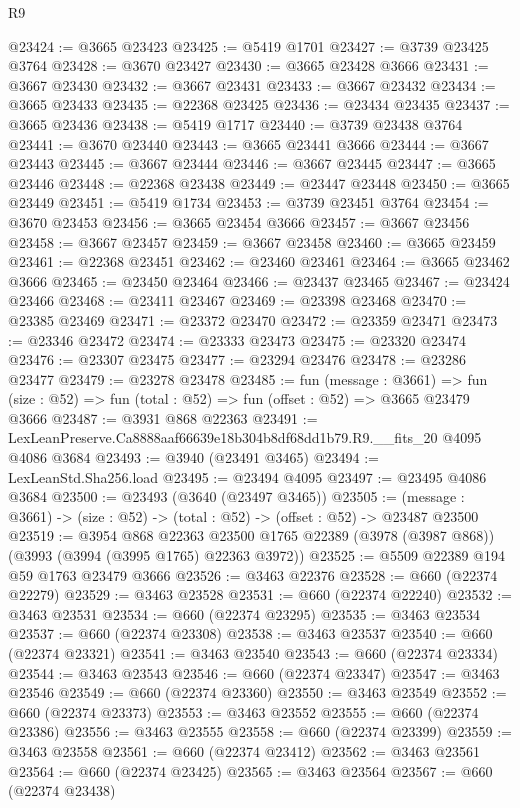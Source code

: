 \begin{lexlean}{R9}
\begin{coremodule}
@23424 := @3665 @23423
@23425 := @5419 @1701
@23427 := @3739 @23425 @3764
@23428 := @3670 @23427
@23430 := @3665 @23428 @3666
@23431 := @3667 @23430
@23432 := @3667 @23431
@23433 := @3667 @23432
@23434 := @3665 @23433
@23435 := @22368 @23425
@23436 := @23434 @23435
@23437 := @3665 @23436
@23438 := @5419 @1717
@23440 := @3739 @23438 @3764
@23441 := @3670 @23440
@23443 := @3665 @23441 @3666
@23444 := @3667 @23443
@23445 := @3667 @23444
@23446 := @3667 @23445
@23447 := @3665 @23446
@23448 := @22368 @23438
@23449 := @23447 @23448
@23450 := @3665 @23449
@23451 := @5419 @1734
@23453 := @3739 @23451 @3764
@23454 := @3670 @23453
@23456 := @3665 @23454 @3666
@23457 := @3667 @23456
@23458 := @3667 @23457
@23459 := @3667 @23458
@23460 := @3665 @23459
@23461 := @22368 @23451
@23462 := @23460 @23461
@23464 := @3665 @23462 @3666
@23465 := @23450 @23464
@23466 := @23437 @23465
@23467 := @23424 @23466
@23468 := @23411 @23467
@23469 := @23398 @23468
@23470 := @23385 @23469
@23471 := @23372 @23470
@23472 := @23359 @23471
@23473 := @23346 @23472
@23474 := @23333 @23473
@23475 := @23320 @23474
@23476 := @23307 @23475
@23477 := @23294 @23476
@23478 := @23286 @23477
@23479 := @23278 @23478
@23485 := fun (message : @3661) =>
  fun (size : @52) => fun (total : @52) => fun (offset : @52) => @3665 @23479 @3666
@23487 := @3931 @868 @22363
@23491 := LexLeanPreserve.Ca8888aaf66639e18b304b8df68dd1b79.R9.__fits_20 @4095 @4086 @3684
@23493 := @3940 (@23491 @3465)
@23494 := LexLeanStd.Sha256.load
@23495 := @23494 @4095
@23497 := @23495 @4086 @3684
@23500 := @23493 (@3640 (@23497 @3465))
@23505 := (message : @3661) -> (size : @52) -> (total : @52) -> (offset : @52) -> @23487 @23500
@23519 := @3954
    @868
    @22363
    @23500
    @1765
    @22389
    (@3978 (@3987 @868))
    (@3993 (@3994 (@3995 @1765) @22363 @3972))
@23525 := @5509 @22389 @194 @59 @1763 @23479 @3666
@23526 := @3463 @22376
@23528 := @660 (@22374 @22279)
@23529 := @3463 @23528
@23531 := @660 (@22374 @22240)
@23532 := @3463 @23531
@23534 := @660 (@22374 @23295)
@23535 := @3463 @23534
@23537 := @660 (@22374 @23308)
@23538 := @3463 @23537
@23540 := @660 (@22374 @23321)
@23541 := @3463 @23540
@23543 := @660 (@22374 @23334)
@23544 := @3463 @23543
@23546 := @660 (@22374 @23347)
@23547 := @3463 @23546
@23549 := @660 (@22374 @23360)
@23550 := @3463 @23549
@23552 := @660 (@22374 @23373)
@23553 := @3463 @23552
@23555 := @660 (@22374 @23386)
@23556 := @3463 @23555
@23558 := @660 (@22374 @23399)
@23559 := @3463 @23558
@23561 := @660 (@22374 @23412)
@23562 := @3463 @23561
@23564 := @660 (@22374 @23425)
@23565 := @3463 @23564
@23567 := @660 (@22374 @23438)

\end{coremodule}
\end{lexlean}
